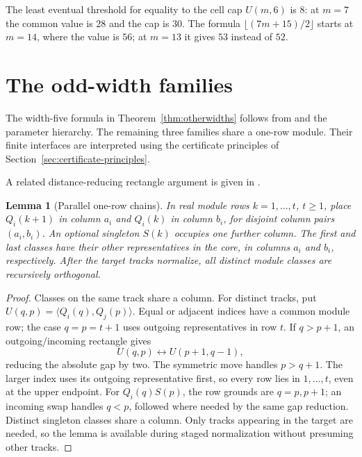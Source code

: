 \documentclass[11pt,a4paper]{article}
\newtheorem{lemma}[theorem]{Lemma}
\theoremstyle{definition}
\begin{document}
The least eventual threshold for equality to the cell cap $U(m,6)$ is
$8$: at $m=7$ the common value is $28$ and the cap is $30$.
The formula $\lfloor(7m+15)/2\rfloor$ starts at $m=14$, where the value
is $56$; at $m=13$ it gives $53$ instead of $52$.

\section{The odd-width families}\label{sec:otherwidths}

The width-five formula in Theorem~\ref{thm:otherwidths} follows from
\cite[Theorem~5.4 and Corollary~5.5]{XiChangFive} and the parameter hierarchy.
The remaining three families share a one-row module. Their finite
interfaces are interpreted using the certificate principles of
Section~\ref{sec:certificate-principles}.

A related distance-reducing rectangle argument is given in
\cite[Lemma~4.2]{XiChangFive}.

\begin{lemma}[Parallel one-row chains]\label{lem:parallel}
In real module rows $k=1,\ldots,t$, $t\ge1$, place $Q_i(k+1)$ in
column $a_i$ and $Q_i(k)$ in column $b_i$, for disjoint column pairs
$(a_i,b_i)$. An optional singleton $S(k)$ occupies one further column.
The first and last classes have their other representatives in the core,
in columns $a_i$ and $b_i$, respectively.
After the target tracks normalize, all distinct module classes are
recursively orthogonal.
\end{lemma}
\begin{proof}
Classes on the same track share a column. For distinct tracks, put
$U(q,p)=\langle Q_i(q),Q_j(p)\rangle$. Equal or adjacent indices
have a common module row; the case $q=p=t+1$ uses outgoing
representatives in row $t$. If $q>p+1$, an outgoing/incoming rectangle
gives
\begin{equation}\label{eq:paralleldrift}
 U(q,p)\longleftrightarrow U(p+1,q-1),
\end{equation}
reducing the absolute gap by two. The symmetric move handles $p>q+1$.
The larger index uses its outgoing representative first, so every row
lies in $1,\ldots,t$, even at the upper endpoint. For $Q_i(q)S(p)$, the row grounds are $q=p,p+1$; an incoming swap
handles $q<p$, followed where needed by the same gap reduction.
Distinct singleton classes share a column. Only tracks appearing in
the target are needed, so the lemma is available during staged
normalization without presuming other tracks.
\end{proof}
\end{document}
